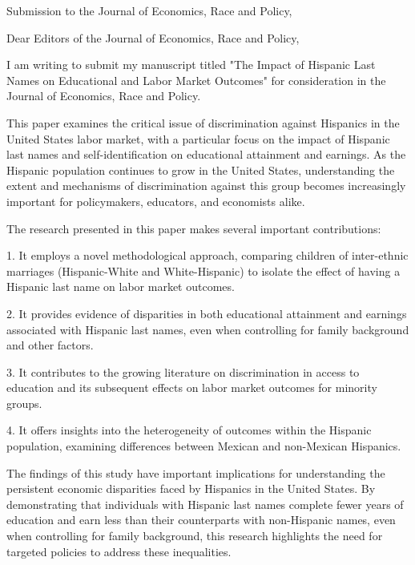 \documentclass[12pt,english]{article}
\begin{document}
\thispagestyle{empty}
\begingroup
  \doublespacing
  \centering
  \LARGE Submission to the Journal of Economics, Race and Policy, \\[0.25em]
\endgroup

\noindent Dear Editors of the Journal of Economics, Race and Policy,

\bigskip
\noindent I am writing to submit my manuscript titled "The Impact of Hispanic Last Names on Educational and Labor Market Outcomes" for consideration in the Journal of Economics, Race and Policy.

\bigskip
\noindent This paper examines the critical issue of discrimination against Hispanics in the United States labor market, with a particular focus on the impact of Hispanic last names and self-identification on educational attainment and earnings. As the Hispanic population continues to grow in the United States, understanding the extent and mechanisms of discrimination against this group becomes increasingly important for policymakers, educators, and economists alike.

\bigskip
\noindent The research presented in this paper makes several important contributions:

1. It employs a novel methodological approach, comparing children of inter-ethnic marriages (Hispanic-White and White-Hispanic) to isolate the effect of having a Hispanic last name on labor market outcomes.

2. It provides evidence of disparities in both educational attainment and earnings associated with Hispanic last names, even when controlling for family background and other factors.

3. It contributes to the growing literature on discrimination in access to education and its subsequent effects on labor market outcomes for minority groups.

4. It offers insights into the heterogeneity of outcomes within the Hispanic population, examining differences between Mexican and non-Mexican Hispanics.

\bigskip
\noindent The findings of this study have important implications for understanding the persistent economic disparities faced by Hispanics in the United States. By demonstrating that individuals with Hispanic last names complete fewer years of education and earn less than their counterparts with non-Hispanic names, even when controlling for family background, this research highlights the need for targeted policies to address these inequalities.
\end{document}
